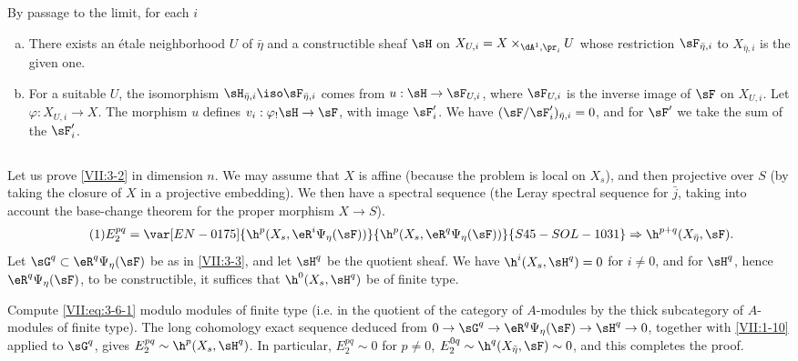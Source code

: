By passage to the limit, for each $i$
\begin{enumerate}[a)]
  \item There exists an étale neighborhood $U$ of $\bar\eta$ and a
    constructible sheaf $\sH$ on
    $X_{U,i} = X\times_{\dA^1,\pr_i} U$ whose restriction
    $\sF_{\bar\eta,i}$ to $X_{\bar\eta,i}$ is the given one.
  \item For a suitable $U$, the isomorphism
    $\sH_{\bar\eta,i} \iso \sF_{\bar\eta,i}$ comes from
    $u:\sH\to \sF_{U,i}$, where $\sF_{U,i}$ is the inverse image of $\sF$ on
    $X_{U,i}$. Let $\varphi:X_{U,i} \to X$. The morphism $u$ defines
    $v_i:\varphi_! \sH \to \sF$, with image $\sF_i'$. We have
    $(\sF/\sF_i')_{\bar\eta,i} = 0$, and for $\sF'$ we take the sum of the
    $\sF_i'$.
\end{enumerate}






\subsection{}\label{VII:3-6}

Let us prove \ref{VII:3-2} in dimension $n$. We may assume that $X$ is affine
(because the problem is local on $X_s$), and then projective over $S$ (by
taking the closure of $X$ in a projective embedding). We then have a spectral
sequence  (the Leray spectral sequence for $\bar j$, taking
into account the base-change theorem for the proper morphism $X\to S$).
\begin{equation*}\tag{1}\label{VII:eq:3-6-1}
  E_2^{p q} = \var[EN-0175]{\h^p(X_s,\eR^i\Psi_\eta(\sF))}{\h^p(X_s,\eR^q\Psi_\eta(\sF))}{S45-SOL-1031} \Rightarrow \h^{p+q}(X_{\bar\eta},\sF) \text{.} 
\end{equation*}
Let $\sG^q\subset \eR^q \Psi_\eta(\sF)$ be as in \ref{VII:3-3}, and let
$\sH^q$ be the quotient sheaf. We have $\h^i(X_s,\sH^q)=0$ for $i\ne 0$, and
for $\sH^q$, hence $\eR^q\Psi_\eta(\sF)$, to be constructible, it suffices
that $\h^0(X_s,\sH^q)$ be of finite type.

Compute \eqref{VII:eq:3-6-1} modulo modules of finite type (i.e. in the
quotient of the category of $A$-modules by the thick subcategory of
$A$-modules of finite type). The long cohomology exact sequence deduced from
$0 \to \sG^q \to \eR^q\Psi_\eta(\sF) \to \sH^q \to 0$, together with
\ref{VII:1-10} applied to $\sG^q$, gives
$E_2^{p q} \sim \h^p(X_s,\sH^q)$. In particular,
$E_2^{p q}\sim 0$ for $p\ne 0$,
$E_2^{0 q}\sim \h^q(X_{\bar\eta},\sF) \sim 0$, and this completes the proof.

